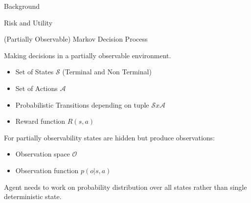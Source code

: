 \begin{exampleblock}{Background}
\begin{block}{\normalsize{Risk and Utility}}
\end{block}

\begin{block}{(Partially Observable) Markov Decision Process}

Making decisions in a partially observable environment.

\begin{itemize}
    \item Set of States $\mathcal{S}$ (Terminal and Non Terminal)
    \item Set of Actions $\mathcal{A}$
    \item Probabilistic Transitions depending on tuple $\mathcal{S} x \mathcal{A}$
    \item Reward function $R(s,a)$
\end{itemize}

For partially observability states are hidden but produce observations:
\begin{itemize}
    \item Observation space $\mathcal{O}$
    \item Observation function $p(o | s, a)$
\end{itemize}

Agent needs to work on probability distribution over all states rather than single deterministic state.
\end{block}

\end{exampleblock}
